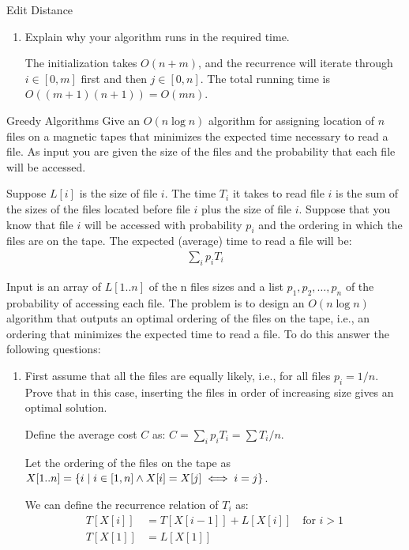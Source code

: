 \documentclass{article}
\numberwithin{table}{section}
\numberwithin{figure}{section}
\begin{document}
\begin{section}{Edit Distance}
\begin{enumerate}
    \item Explain why your algorithm runs in the required time.
    \begin{tcolorbox}
    The initialization takes $O(n+m)$, and the recurrence will iterate through $i \in [0, m]$ first and then $j \in [0, n]$. The total running time is $O((m+1)(n+1)) = O(mn)$.
    \end{tcolorbox}
\end{enumerate}
\end{section}

\newpage
\begin{section}{Greedy Algorithms}
Give an $O(n \log n)$ algorithm for assigning location of $n$ files on a magnetic tapes that minimizes the expected time necessary to read a file. As input you are given the size of the files and the probability that each file will be accessed.

Suppose $L[i]$ is the size of file $i$. The time $T_i$ it takes to read file $i$ is the sum of the sizes of the files located before file $i$ plus the size of file $i$. Suppose that you know that file $i$ will be accessed with probability $p_i$ and
the ordering in which the files are on the tape. The expected (average) time to read a file will be:
\begin{align*}
    \sum_{i} p_i T_i
\end{align*}

Input is an array of $L[1..n]$ of the n files sizes and a list $p_1, p_2, \dots, p_n$ of the probability of accessing each file. The problem is to design an $O(n \log n)$ algorithm that outputs an optimal ordering of the files on the tape, i.e., an ordering that minimizes the expected time to read a file. 
To do this answer the following questions:
\begin{enumerate}
    \item First assume that all the files are equally likely, i.e., for all files $p_i = 1/n$. Prove that in this case, inserting the files in order of increasing size gives an optimal solution.
    
    \begin{tcolorbox}
    Define the average cost $C$ as: $C = \sum_i p_i T_i = \sum T_i/n$.
    
    Let the ordering of the files on the tape as $X[1..n] = \cbracket{\giventhat{i}{i \in [1, n] \land X[i] = X[j] \iff i = j}}$.
    
    We can define the recurrence relation of $T_i$ as: 
    \begin{align*}
        T[X[i]] &= T[X[i-1]] + L[X[i]]  \quad \text{for $i > 1$} \\
        T[X[1]] &= L[X[1]]
    \end{align*}
    

\end{tcolorbox}
\end{enumerate}
\end{section}
\end{document}
